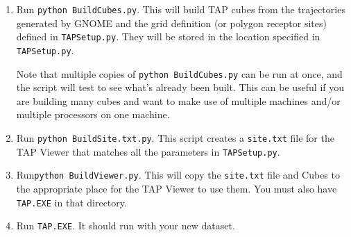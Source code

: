 \documentclass[12pt]{article}      %
\newcommand{\tap}{\textsf{TAP}\xspace}
\newcommand{\gnome}{\textsf{GNOME}\xspace}
\newcommand{\filename}[1]{\texttt{#1}}
\newcommand{\command}[1]{\texttt{#1}}
\begin{document}
\begin{enumerate}
\item Run \command{python BuildCubes.py}. This will build \tap cubes
  from the trajectories generated by \gnome and the grid definition (or
  polygon receptor sites) defined in \filename{TAP\-Setup.py}. They will
  be stored in the location specified in \filename{TAP\-Setup.py}.

  Note that multiple copies of \command{python BuildCubes.py} can be
  run at once, and the script will test to see what's already been
  built. This can be useful if you are building many cubes and want to
  make use of multiple machines and/or multiple processors on one machine.

\item Run \command{python BuildSite.txt.py}. This script creates a
  \filename{site.txt} file for the \tap Viewer that matches all the
  parameters in \filename{TAP\-Setup.py}.

\item Run\command{python BuildViewer.py}. This will copy the
  \filename{site.txt} file and Cubes to the appropriate place for the
  \tap Viewer to use them. You must also have \filename{TAP.EXE} in that
  directory.

\item Run \filename{TAP.EXE}. It should run with your new dataset.


\end{enumerate}










 
\end{document}
